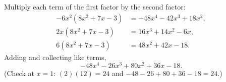 Multiply each term of the first factor by the second factor:
\begin{align*}
-6x^2(8x^2+7x-3)&=-48x^4-42x^3+18x^2,\\
2x(8x^2+7x-3)&=16x^3+14x^2-6x,\\
6(8x^2+7x-3)&=48x^2+42x-18.
\end{align*}
Adding and collecting like terms,
\[\boxed{-48x^4-26x^3+80x^2+36x-18}.\]
(Check at $x=1$: $(2)(12)=24$ and $-48-26+80+36-18=24$.)
